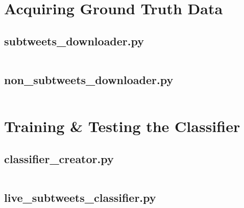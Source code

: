 \documentclass[11pt, twoside, reqno]{book}
\begin{document}
\begin{appendices}
\chapter{Acquiring Ground Truth Data}

\section{subtweets\_downloader.py}
\inputminted[breaklines,linenos,fontsize=\scriptsize]{python}{subtweets_downloader.py}

\section{non\_subtweets\_downloader.py}
\inputminted[breaklines,linenos,fontsize=\scriptsize]{python}{non_subtweets_downloader.py}

\chapter{Training \& Testing the Classifier}

\section{classifier\_creator.py}
\inputminted[breaklines,linenos,fontsize=\scriptsize]{python}{classifier_creator.py}

\section{live\_subtweets\_classifier.py}
\inputminted[breaklines,linenos,fontsize=\scriptsize]{python}{live_subtweets_classifier.py}

\end{appendices}
\end{document}
